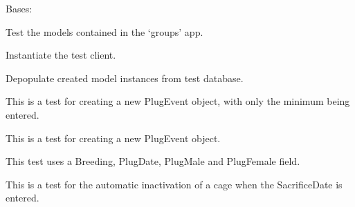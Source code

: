 \documentclass[letterpaper,10pt,english]{sphinxmanual}
\begin{document}
\begin{fulllineitems}
\label{api:timed_mating.tests.GroupsModelTests}
Bases: 

Test the models contained in the `groups' app.

\begin{fulllineitems}
\label{api:timed_mating.tests.GroupsModelTests.setUp}
Instantiate the test client.

\end{fulllineitems}


\begin{fulllineitems}
\label{api:timed_mating.tests.GroupsModelTests.tearDown}
Depopulate created model instances from test database.

\end{fulllineitems}


\begin{fulllineitems}
\label{api:timed_mating.tests.GroupsModelTests.test_create_plugevent_minimal}
This is a test for creating a new PlugEvent object, with only the minimum being entered.

\end{fulllineitems}


\begin{fulllineitems}
\label{api:timed_mating.tests.GroupsModelTests.test_create_plugevent_most_fields}
This is a test for creating a new PlugEvent object.

This test uses a Breeding, PlugDate, PlugMale and PlugFemale field.

\end{fulllineitems}


\begin{fulllineitems}
\label{api:timed_mating.tests.GroupsModelTests.test_set_plugevet_inactive}
This is a test for the automatic inactivation of a cage when the SacrificeDate is entered.

\end{fulllineitems}


\end{fulllineitems}
\end{document}

